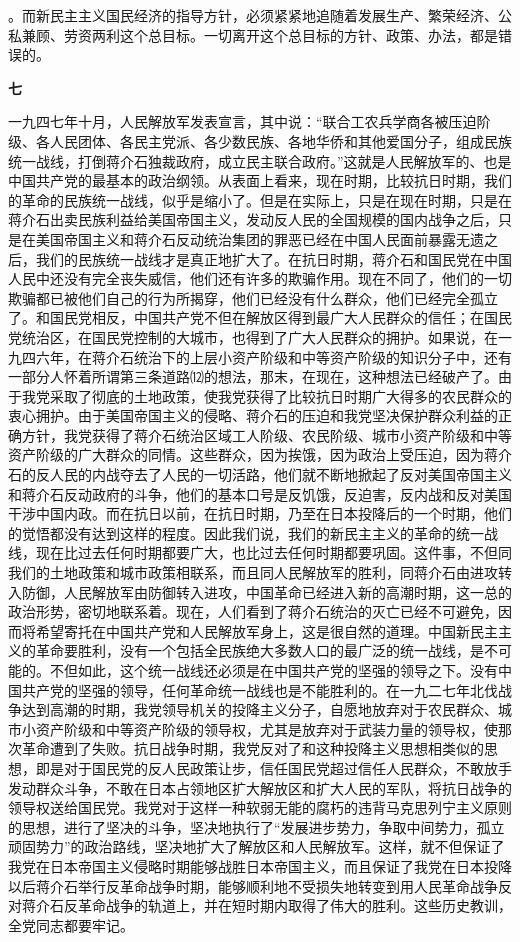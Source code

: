 \documentclass[UTF-8, a5paper, 12pt]{ctexart}
\begin{document}
。而新民主主义国民经济的指导方针，必须紧紧地追随着发展生产、繁荣经济、公私兼顾、劳资两利这个总目标。一切离开这个总目标的方针、政策、办法，都是错误的。

\textbf{七}


一九四七年十月，人民解放军发表宣言，其中说：“联合工农兵学商各被压迫阶级、各人民团体、各民主党派、各少数民族、各地华侨和其他爱国分子，组成民族统一战线，打倒蒋介石独裁政府，成立民主联合政府。”这就是人民解放军的、也是中国共产党的最基本的政治纲领。从表面上看来，现在时期，比较抗日时期，我们的革命的民族统一战线，似乎是缩小了。但是在实际上，只是在现在时期，只是在蒋介石出卖民族利益给美国帝国主义，发动反人民的全国规模的国内战争之后，只是在美国帝国主义和蒋介石反动统治集团的罪恶已经在中国人民面前暴露无遗之后，我们的民族统一战线才是真正地扩大了。在抗日时期，蒋介石和国民党在中国人民中还没有完全丧失威信，他们还有许多的欺骗作用。现在不同了，他们的一切欺骗都已被他们自己的行为所揭穿，他们已经没有什么群众，他们已经完全孤立了。和国民党相反，中国共产党不但在解放区得到最广大人民群众的信任；在国民党统治区，在国民党控制的大城市，也得到了广大人民群众的拥护。如果说，在一九四六年，在蒋介石统治下的上层小资产阶级和中等资产阶级的知识分子中，还有一部分人怀着所谓第三条道路⑿的想法，那末，在现在，这种想法已经破产了。由于我党采取了彻底的土地政策，使我党获得了比较抗日时期广大得多的农民群众的衷心拥护。由于美国帝国主义的侵略、蒋介石的压迫和我党坚决保护群众利益的正确方针，我党获得了蒋介石统治区域工人阶级、农民阶级、城市小资产阶级和中等资产阶级的广大群众的同情。这些群众，因为挨饿，因为政治上受压迫，因为蒋介石的反人民的内战夺去了人民的一切活路，他们就不断地掀起了反对美国帝国主义和蒋介石反动政府的斗争，他们的基本口号是反饥饿，反迫害，反内战和反对美国干涉中国内政。而在抗日以前，在抗日时期，乃至在日本投降后的一个时期，他们的觉悟都没有达到这样的程度。因此我们说，我们的新民主主义的革命的统一战线，现在比过去任何时期都要广大，也比过去任何时期都要巩固。这件事，不但同我们的土地政策和城市政策相联系，而且同人民解放军的胜利，同蒋介石由进攻转入防御，人民解放军由防御转入进攻，中国革命已经进入新的高潮时期，这一总的政治形势，密切地联系着。现在，人们看到了蒋介石统治的灭亡已经不可避免，因而将希望寄托在中国共产党和人民解放军身上，这是很自然的道理。中国新民主主义的革命要胜利，没有一个包括全民族绝大多数人口的最广泛的统一战线，是不可能的。不但如此，这个统一战线还必须是在中国共产党的坚强的领导之下。没有中国共产党的坚强的领导，任何革命统一战线也是不能胜利的。在一九二七年北伐战争达到高潮的时期，我党领导机关的投降主义分子，自愿地放弃对于农民群众、城市小资产阶级和中等资产阶级的领导权，尤其是放弃对于武装力量的领导权，使那次革命遭到了失败。抗日战争时期，我党反对了和这种投降主义思想相类似的思想，即是对于国民党的反人民政策让步，信任国民党超过信任人民群众，不敢放手发动群众斗争，不敢在日本占领地区扩大解放区和扩大人民的军队，将抗日战争的领导权送给国民党。我党对于这样一种软弱无能的腐朽的违背马克思列宁主义原则的思想，进行了坚决的斗争，坚决地执行了“发展进步势力，争取中间势力，孤立顽固势力”的政治路线，坚决地扩大了解放区和人民解放军。这样，就不但保证了我党在日本帝国主义侵略时期能够战胜日本帝国主义，而且保证了我党在日本投降以后蒋介石举行反革命战争时期，能够顺利地不受损失地转变到用人民革命战争反对蒋介石反革命战争的轨道上，并在短时期内取得了伟大的胜利。这些历史教训，全党同志都要牢记。
\end{document}
